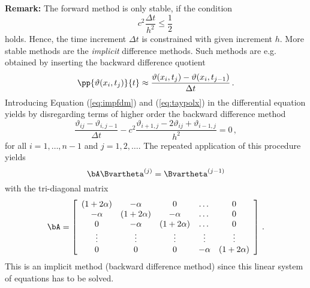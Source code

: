 {\bf Remark:} 
The forward method is only stable, if the condition 
%
\begin{equation}
c^2 \frac{\Delta t}{h^2} \leq \frac{1}{2} \, 
\end{equation}
%
holds. 
Hence, the time increment $\Delta t$ is constrained with 
given increment $h$.
More stable methods are the {\it implicit} difference 
methods. 
Such methods are e.g. obtained by inserting the 
backward difference quotient 
%
\begin{equation}
 \pp{\vartheta(x_i,t_j)}{t} \approx \frac{\vartheta(x_i,t_j ) 
   -\vartheta(x_i,t_{j-1})}{\Delta t} \, .
\label{eq:impfdm}
\end{equation}
%
Introducing Equation (\ref{eq:impfdm}) and 
(\ref{eq:taypolx}) in the differential equation 
yields by disregarding terms of higher order the 
backward difference method 
%
\begin{equation}
 \frac{\vartheta_{ij}-\vartheta_{i,j-1}}{\Delta t}  
 -c^2\frac{\vartheta_{i+1,j}
 -2\vartheta_{ij}+\vartheta_{i-1,j}}{h^2} = 0 \, , 
\end{equation}
for all $i=1,\dots,n-1$ and $j=1,2,\dots$. 
The repeated application of this procedure yields
%
\begin{equation}
\bA \Bvartheta^{(j)} = \Bvartheta^{(j-1)} 
\end{equation}
%
with the tri-diagonal matrix
%
\begin{equation}
\bA = \left[
\begin{array}{ccccc}
(1 + 2 \alpha) &   - \alpha     &       0        & \dots  & 0      \\
   - \alpha    & (1 + 2 \alpha) &  - \alpha      & \dots  & 0      \\
      0        &  -  \alpha     & (1 + 2 \alpha) & \dots  & 0      \\
    \vdots     &     \vdots     &    \vdots      & \vdots & \vdots \\
       0       &      0         &        0       &-\alpha & (1 + 2 \alpha)
\end{array} 
\right] \, .
\end{equation}
%
This is an implicit method (backward difference method) 
since this linear system of equations has to be solved. 

